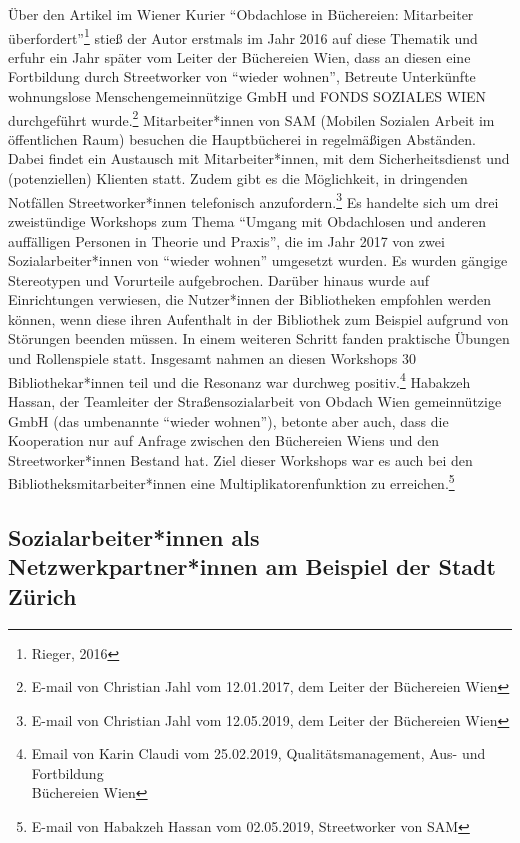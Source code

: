 \documentclass[a4paper,
fontsize=11pt,
oneside,
numbers=noperiodatend,
parskip=half-,
bibliography=totoc,
final
]{scrartcl}
\begin{document}
Über den Artikel im Wiener Kurier \enquote{Obdachlose in Büchereien:
Mitarbeiter überfordert}\footnote{Rieger, 2016} stieß der Autor erstmals
im Jahr 2016 auf diese Thematik und erfuhr ein Jahr später vom Leiter
der Büchereien Wien, dass an diesen eine Fortbildung durch Streetworker
von \enquote{wieder wohnen}, Betreute Unterkünfte wohnungslose
Menschengemeinnützige GmbH und FONDS SOZIALES WIEN durchgeführt
wurde.\footnote{E-mail von Christian Jahl vom 12.01.2017, dem Leiter der
  Büchereien Wien} Mitarbeiter*innen von SAM (Mobilen Sozialen Arbeit im
öffentlichen Raum) besuchen die Hauptbücherei in regelmäßigen Abständen.
Dabei findet ein Austausch mit Mitarbeiter*innen, mit dem
Sicherheitsdienst und (potenziellen) Klienten statt. Zudem gibt es die
Möglichkeit, in dringenden Notfällen Streetworker*innen telefonisch
anzufordern.\footnote{E-mail von Christian Jahl vom 12.05.2019, dem
  Leiter der Büchereien Wien} Es handelte sich um drei zweistündige
Workshops zum Thema \enquote{Umgang mit Obdachlosen und anderen
auffälligen Personen in Theorie und Praxis}, die im Jahr 2017 von zwei
Sozialarbeiter*innen von \enquote{wieder wohnen} umgesetzt wurden. Es
wurden gängige Stereotypen und Vorurteile aufgebrochen. Darüber hinaus
wurde auf Einrichtungen verwiesen, die Nutzer*innen der Bibliotheken
empfohlen werden können, wenn diese ihren Aufenthalt in der Bibliothek
zum Beispiel aufgrund von Störungen beenden müssen. In einem weiteren
Schritt fanden praktische Übungen und Rollenspiele statt. Insgesamt
nahmen an diesen Workshops 30 Bibliothekar*innen teil und die Resonanz
war durchweg positiv.\footnote{Email von Karin Claudi vom 25.02.2019,
  Qualitätsmanagement, Aus- und Fortbildung\\
  Büchereien Wien} Habakzeh Hassan, der Teamleiter der
Straßensozialarbeit von Obdach Wien gemeinnützige GmbH (das umbenannte
\enquote{wieder wohnen}), betonte aber auch, dass die Kooperation nur
auf Anfrage zwischen den Büchereien Wiens und den Streetworker*innen
Bestand hat. Ziel dieser Workshops war es auch bei den
Bibliotheksmitarbeiter*innen eine Multiplikatorenfunktion zu
erreichen.\footnote{E-mail von Habakzeh Hassan vom 02.05.2019,
  Streetworker von SAM}

\hypertarget{sozialarbeiterinnen-als-netzwerkpartnerinnen-am-beispiel-der-stadt-zuxfcrich}{%
\subsection{Sozialarbeiter*innen als Netzwerkpartner*innen am Beispiel
der Stadt
Zürich}\label{sozialarbeiterinnen-als-netzwerkpartnerinnen-am-beispiel-der-stadt-zuxfcrich}}
\end{document}
